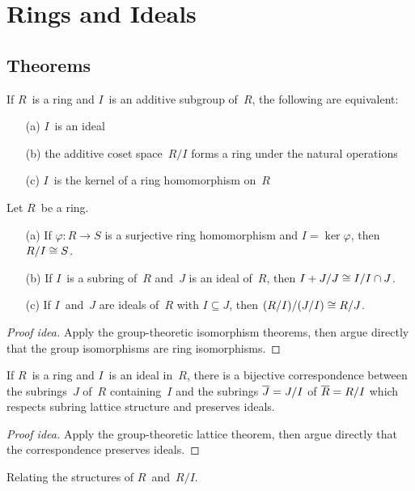 %
%
%
\section{Rings and Ideals}
\subsection*{Theorems}
\begin{thm}[Ideals]
If \(R\)~is a ring and \(I\)~is an additive subgroup of~\(R\), the following are equivalent:
\begin{enumerate}[itemsep=0pt]
\item[(a)] \(I\)~is an ideal
\item[(b)] the additive coset space~\(R/I\) forms a ring under the natural operations
\item[(c)] \(I\)~is the kernel of a ring homomorphism on~\(R\)
\end{enumerate}
\end{thm}

\begin{thm}
Let \(R\)~be a ring.
\begin{enumerate}[itemsep=0pt]
\item[(a)] If \(\varphi:R\to S\) is a surjective ring homomorphism and \(I=\ker\varphi\), then \(R/I\cong S\).
\item[(b)] If \(I\)~is a subring of~\(R\) and~\(J\) is an ideal of~\(R\), then \(I+J/J\cong I/I\cap J\).
\item[(c)] If \(I\)~and~\(J\) are ideals of~\(R\) with \(I\subseteq J\), then \((R/I)/(J/I)\cong R/J\).
\end{enumerate}
\end{thm}
\begin{proof}[Proof idea]
Apply the group-theoretic isomorphism theorems, then argue directly that the group isomorphisms are ring isomorphisms.
\end{proof}

\begin{thm}
If \(R\)~is a ring and \(I\)~is an ideal in~\(R\), there is a bijective correspondence between the subrings~\(J\) of~\(R\) containing~\(I\) and the subrings \(\overline{J}=J/I\) of \(\overline{R}=R/I\) which respects subring lattice structure and preserves ideals.
\end{thm}
\begin{proof}[Proof idea]
Apply the group-theoretic lattice theorem, then argue directly that the correspondence preserves ideals.
\end{proof}
\begin{app}
Relating the structures of \(R\)~and~\(R/I\).
\end{app}

